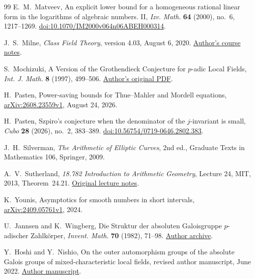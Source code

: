 \documentclass[11pt]{amsart}
\theoremstyle{definition}
\theoremstyle{remark}
\begin{document}
\begin{thebibliography}{99}
E.~M.~Matveev, An explicit lower bound for a homogeneous rational linear
form in the logarithms of algebraic numbers. II,
\emph{Izv. Math.} \textbf{64} (2000), no.~6, 1217--1269.
\href{https://doi.org/10.1070/IM2000v064n06ABEH000314}{doi:10.1070/IM2000v064n06ABEH000314}.

J.~S.~Milne, \emph{Class Field Theory}, version 4.03, August 6, 2020.
\href{https://www.jmilne.org/math/CourseNotes/CFT.pdf}{Author's course notes}.

S.~Mochizuki, A Version of the Grothendieck Conjecture for $p$-adic
Local Fields, \emph{Int. J. Math.} \textbf{8} (1997), 499--506.
\href{https://www.kurims.kyoto-u.ac.jp/~motizuki/A%20Version%20of%20the%20Grothendieck%20Conjecture%20for%20p-adic%20Local%20Fields.pdf}{Author's original PDF}.

H.~Pasten, Power-saving bounds for Thue--Mahler and Mordell equations,
\href{https://arxiv.org/abs/2608.23559v1}{arXiv:2608.23559v1}, August 24, 2026.

H.~Pasten, Szpiro's conjecture when the denominator of the $j$-invariant
is small, \emph{Cubo} \textbf{28} (2026), no.~2, 383--389.
\href{https://doi.org/10.56754/0719-0646.2802.383}{doi:10.56754/0719-0646.2802.383}.

J.~H.~Silverman, \emph{The Arithmetic of Elliptic Curves},
2nd ed., Graduate Texts in Mathematics 106, Springer, 2009.

A.~V.~Sutherland, \emph{18.782 Introduction to Arithmetic Geometry},
Lecture 24, MIT, 2013, Theorem~24.21.
\href{https://math.mit.edu/classes/18.782/2013fa/LectureNotes24.pdf}{Original lecture notes}.

K.~Younis, Asymptotics for smooth numbers in short intervals,
\href{https://arxiv.org/abs/2409.05761v1}{arXiv:2409.05761v1}, 2024.

U.~Jannsen and K.~Wingberg, Die Struktur der absoluten Galoisgruppe
$p$-adischer Zahlk\"orper,
\emph{Invent. Math.} \textbf{70} (1982), 71--98.
\href{https://epub.uni-regensburg.de/26689/1/jannsen17.pdf}{Author archive}.

Y.~Hoshi and Y.~Nishio, On the outer automorphism groups of the absolute
Galois groups of mixed-characteristic local fields,
revised author manuscript, June 2022.
\href{https://www.kurims.kyoto-u.ac.jp/~yuichiro/rims1931revised.pdf}{Author manuscript}.


\end{thebibliography}
\end{document}
